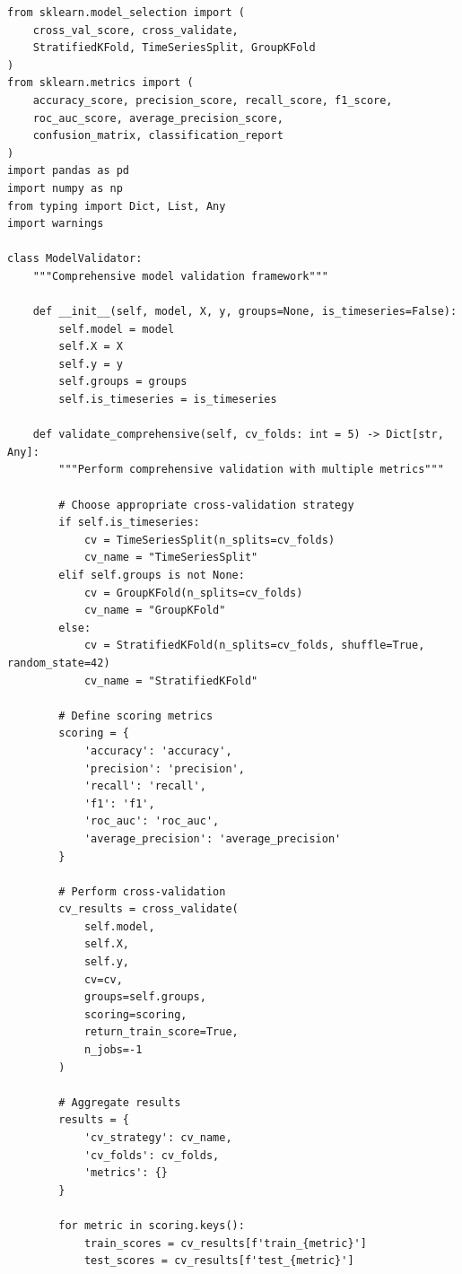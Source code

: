 \begin{lstlisting}[style=python, caption=Comprehensive model validation framework]
from sklearn.model_selection import (
    cross_val_score, cross_validate,
    StratifiedKFold, TimeSeriesSplit, GroupKFold
)
from sklearn.metrics import (
    accuracy_score, precision_score, recall_score, f1_score,
    roc_auc_score, average_precision_score,
    confusion_matrix, classification_report
)
import pandas as pd
import numpy as np
from typing import Dict, List, Any
import warnings

class ModelValidator:
    """Comprehensive model validation framework"""

    def __init__(self, model, X, y, groups=None, is_timeseries=False):
        self.model = model
        self.X = X
        self.y = y
        self.groups = groups
        self.is_timeseries = is_timeseries

    def validate_comprehensive(self, cv_folds: int = 5) -> Dict[str, Any]:
        """Perform comprehensive validation with multiple metrics"""

        # Choose appropriate cross-validation strategy
        if self.is_timeseries:
            cv = TimeSeriesSplit(n_splits=cv_folds)
            cv_name = "TimeSeriesSplit"
        elif self.groups is not None:
            cv = GroupKFold(n_splits=cv_folds)
            cv_name = "GroupKFold"
        else:
            cv = StratifiedKFold(n_splits=cv_folds, shuffle=True, random_state=42)
            cv_name = "StratifiedKFold"

        # Define scoring metrics
        scoring = {
            'accuracy': 'accuracy',
            'precision': 'precision',
            'recall': 'recall',
            'f1': 'f1',
            'roc_auc': 'roc_auc',
            'average_precision': 'average_precision'
        }

        # Perform cross-validation
        cv_results = cross_validate(
            self.model,
            self.X,
            self.y,
            cv=cv,
            groups=self.groups,
            scoring=scoring,
            return_train_score=True,
            n_jobs=-1
        )

        # Aggregate results
        results = {
            'cv_strategy': cv_name,
            'cv_folds': cv_folds,
            'metrics': {}
        }

        for metric in scoring.keys():
            train_scores = cv_results[f'train_{metric}']
            test_scores = cv_results[f'test_{metric}']


\end{lstlisting}
